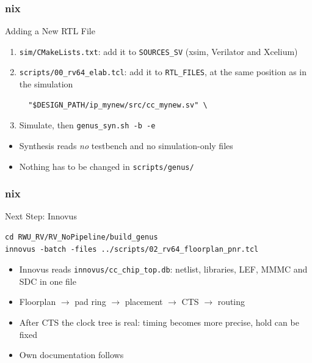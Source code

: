 \documentclass{beamer}
\newcommand{\astitle}{nix}
\newcommand{\assubtitle}{nix}
\newcommand{\cmd}[1]{\texttt{#1}}
\begin{document}
\renewcommand{\assubtitle}{Adding a New RTL File}
\begin{frame}[fragile]
\frametitle{\astitle}
\begin{block}{\assubtitle}
  \footnotesize
  \begin{enumerate}
    \item \cmd{sim/CMakeLists.txt}: add it to \cmd{SOURCES\_SV}
      (xsim, Verilator and Xcelium)
    \item \cmd{scripts/00\_rv64\_elab.tcl}: add it to \cmd{RTL\_FILES},
      at the same position as in the simulation
\begin{lstlisting}
  "$DESIGN_PATH/ip_mynew/src/cc_mynew.sv" \
\end{lstlisting}
    \item Simulate, then \cmd{genus\_syn.sh -b -e}
  \end{enumerate}
  \vspace{4pt}
  \begin{itemize}
    \item Synthesis reads \emph{no} testbench and no simulation-only files
    \item Nothing has to be changed in \cmd{scripts/genus/}
  \end{itemize}
\end{block}
\end{frame}

\renewcommand{\assubtitle}{Next Step: Innovus}
\begin{frame}[fragile]
\frametitle{\astitle}
\begin{block}{\assubtitle}
\begin{lstlisting}[style=sh]
cd RWU_RV/RV_NoPipeline/build_genus
innovus -batch -files ../scripts/02_rv64_floorplan_pnr.tcl
\end{lstlisting}
  \begin{itemize}
    \item Innovus reads \cmd{innovus/cc\_chip\_top.db}: netlist, libraries,
      LEF, MMMC and SDC in one file
    \item Floorplan $\rightarrow$ pad ring $\rightarrow$ placement
      $\rightarrow$ CTS $\rightarrow$ routing
    \item After CTS the clock tree is real: timing becomes more precise,
      hold can be fixed
    \item Own documentation follows
  \end{itemize}
\end{block}
\end{frame}
\end{document}
